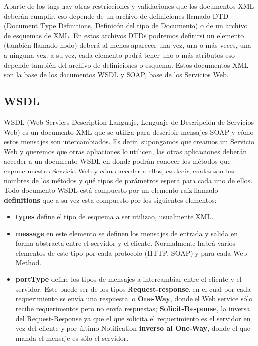 \documentclass[12pt,letterpaper,titlepage]{article}
\begin{document}
Aparte de los tags hay otras restricciones y validaciones que los documentos XML deberán cumplir, eso depende de un archivo de definiciones llamado DTD (Document Type Definitions, Definicón del tipo de Documento) o de un archivo de esquemas de XML. En estos archivos DTDs podremos definirsi un elemento (también llamado nodo) deberá al menos aparecer una vez, una o más veces, una a ninguna vez. a su vez, cada elemento podrá tener uno o más atributos eso depende también del archivo de definiciones o esquema. Estos documentos XML son la base de los documentos WSDL y SOAP, base de los Servicios Web.

\subsection{WSDL}\label{wsdl}
WSDL (Web Services Description Languaje, Lenguaje de Descripción de Servicios Web) es un documento XML que se utiliza para describir mensajes SOAP y cómo estos mensajes son intercambiados. Es decir, supongamos que creamos un Servicio Web y queremos que otras apliaciones lo utilicen, las otras aplicaciones deberán acceder a un documento WSDL en donde podrán conocer los métodos que expone nuestro Servicio Web y cómo acceder a ellos, es decir, cuales son los nombres de los métodos y qué tipos de parámetros espera para cada uno de ellos. Todo documento WSDL está compuesto por un elemento raíz llamado \textbf{definitions} que a su vez esta compuesto por los siguientes elementos:\\

\begin{itemize}\itemsep=0pt
\item \textbf{types} define el tipo de esquema a ser utilizao, usualmente XML.\\
\item \textbf{message} en este elemento se definen los mensajes de entrada y salida en forma abstracta entre el servidor y el cliente. Normalmente habrá varios elementos de este tipo por cada protocolo (HTTP, SOAP) y para cada Web Method.\\
\item \textbf{portType} define los tipos de mensajes a intercambiar entre el cliente y el servidor. Este puede ser de los tipos \textbf{Request-response}, en el cual por cada requerimiento se envía una respuesta, o \textbf{One-Way}, donde el Web service sólo recibe requerimentos pero no envía  respuestas; \textbf{Solicit-Response}, la inversa del Request-Response ya que el que solicita el requerimiento es el servidor en vez del cliente y por último Notification \textbf{inverso al One-Way}, donde el que manda el mensaje es sólo el servidor.\\
\end{itemize}
\end{document}
